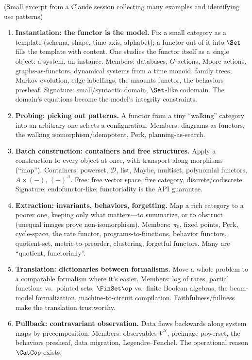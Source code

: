 {(Small excerpt from a Claude session collecting many examples and identifying use patterns)


\begin{enumerate}
\item[F1.] \textbf{Instantiation: the functor is the model.}
Fix a small category as a template (schema, shape, time axis, alphabet); a functor out of it into $\Set$ fills the template with content.
One studies the functor itself as a single object: a system, an instance.
Members: databases, $G$-actions, Moore actions, graphs-as-functors, dynamical systems from a time monoid, family trees, Markov evolution, edge labellings, the amounts functor, the behaviors presheaf.
Signature: small/syntactic domain, $\Set$-like codomain.
The domain's equations become the model's integrity constraints.

\item[F2.] \textbf{Probing: picking out patterns.}
A functor from a tiny ``walking'' category into an arbitrary one selects a configuration.
Members: diagrams-as-functors, the walking isomorphism/idempotent, Perk, planning-as-search.

\item[F3.] \textbf{Batch construction: containers and free structures.}
Apply a construction to every object at once, with transport along morphisms (``map'').
Containers: powerset, $\mathcal{D}$, list, Maybe, multiset, polynomial functors, $A \times (-)$, $(-)^A$.
Free: free vector space, free category, discrete/codiscrete.
Signature: endofunctor-like; functoriality is the API guarantee.

\item[F4.] \textbf{Extraction: invariants, behaviors, forgetting.}
Map a rich category to a poorer one, keeping only what matters---to summarize, or to obstruct (unequal images prove non-isomorphism).
Members: $\pi_0$, fixed points, Perk, cycle-space, the rate functor, programs-to-functions, behavior functors, quotient-set, metric-to-preorder, clustering, forgetful functors.
Many are ``quotient, functorially''.

\item[F5.] \textbf{Translation: dictionaries between formalisms.}
Move a whole problem to a comparable formalism where it's easier.
Members: log of rates, partial functions vs.\ pointed sets, $\FinSet\op$ vs.\ finite Boolean algebras, the beam-model formalization, machine-to-circuit compilation.
Faithfulness/fullness make the translation trustworthy.

\item[F6.] \textbf{Pullback: contravariant observation.}
Data flows backwards along system maps by precomposition.
Members: observables $V^X$, preimage powerset, the behaviors presheaf, data migration, Legendre--Fenchel.
The operational reason $\CatCop$ exists.


\end{enumerate}}
